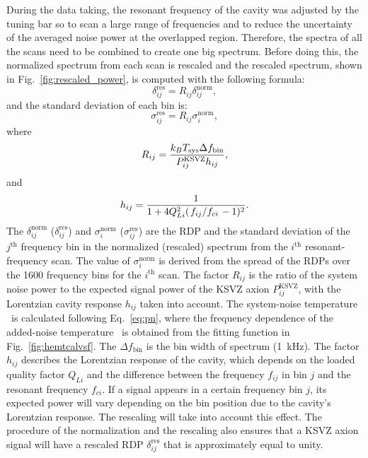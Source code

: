 During the data taking, the resonant frequency of the cavity was  
adjusted by the tuning bar so to scan a large range of frequencies and to 
reduce the uncertainty of the averaged noise power at the overlapped region. 
Therefore, the 
spectra of all the scans need to be combined to create one big spectrum. 
Before doing this, 
the normalized spectrum from each scan is rescaled and the rescaled spectrum, 
shown in 
Fig.~\ref{fig:rescaled_power}, is computed with the following formula:
\begin{equation}
  \label{eq:respower_eqn}
  \delta_{ij}^\text{res} = R_{ij}\delta_{ij}^\text{norm},
\end{equation}
and the standard deviation of each bin is:
\begin{equation}
  \label{eq:ressigma_eqn}
  \sigma_{ij}^\text{res} = R_{ij}\sigma_{i}^\text{norm},
\end{equation}
where 
 \begin{equation}
 R_{ij} = \frac{k_{B}T_\text{sys} \Delta f_\text{bin} }{P_{ij}^\text{KSVZ} h_{ij}}, 
 \label{eq:Rratio}
 \end{equation}
and 
 \begin{equation}
 h_{ij} = \frac{1}{1 + 4Q_{Li}^{2}(\left.f_{ij}\middle/f_{ci}\right.-1)^2}. 
 \label{eq:Lorentz}
 \end{equation}
The $\delta_{ij}^\text{norm}$ ($\delta_{ij}^\text{res}$) and 
$\sigma_{i}^\text{norm}$ ($\sigma_{ij}^\text{res}$) are the 
RDP and the standard deviation of the $j^\text{th}$ frequency bin in 
the normalized (rescaled) spectrum from the 
$i^\text{th}$ resonant-frequency scan. 
The value of $\sigma_{i}^\text{norm}$ is derived from the spread of the 
RDPs over the 1600 frequency bins for the $i^\text{th}$ scan. 
The factor $R_{ij}$ is the ratio of 
the system noise power to the expected signal power of the KSVZ axion 
$P_{ij}^\text{KSVZ}$, with the Lorentzian cavity response $h_{ij}$ 
taken into account. 
The system-noise temperature \tsys\ is calculated following Eq.~\eqref{eq:pn},
 where the frequency dependence of the added-noise temperature \ta\ is 
obtained from the fitting function in Fig.~\ref{fig:hemtcalvsf}. 
The $\Delta f_\text{bin}$ is the bin width of spectrum (1~kHz). 
The factor $h_{ij}$ describes the Lorentzian response of the cavity, 
which depends on the loaded quality factor $Q_{Li}$ and the 
difference between the frequency $f_{ij}$ in bin $j$ and the resonant 
frequency $f_{ci}$. 
%
If a signal appears in a certain frequency bin $j$, its expected power 
will vary depending on the bin position due to the cavity's 
Lorentzian response. The rescaling will take into account this effect. 
The procedure of the normalization and the rescaling also ensures that a 
KSVZ axion signal will have a rescaled RDP $\delta_{ij}^\text{res}$ 
that is approximately equal to unity. 


